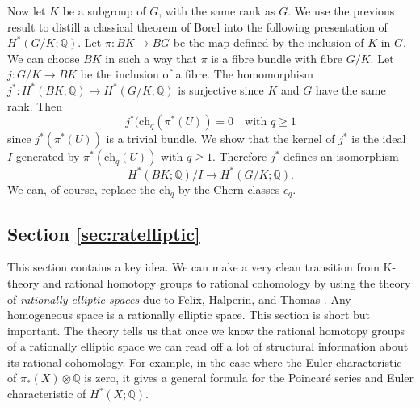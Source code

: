 \documentclass[twoside,a4paper,reqno,11pt]{amsart}
\newcommand{\K}{\mathrm{K}}
\newcommand{\Q}{\mathbb{Q}}
\renewcommand{\o}{\otimes}
\newcommand{\Spin}{\mathrm{Spin}}
\newcommand{\ch}{\mathrm{ch}}
\begin{document}
Now let $K$ be a subgroup of $G$, with the same rank as $G$. We use the previous result to distill a classical theorem of Borel into the following presentation of $H^*(G/K; \Q)$.  Let $\pi : BK \to BG$ be the map defined by the inclusion of $K$ in $G$.  We can choose $BK$ in such a way that $\pi$ is a fibre bundle with fibre $G/K$.  Let $j : G/K \to BK$ be the inclusion of a fibre.  The homomorphism $j^*: H^*(BK; \Q) \to H^*(G/K; \Q)$ is surjective since $K$ and $G$ have the same rank.  Then
 $$
 j^*(\ch_q(\pi^*(U)) = 0 \quad  \text{with $q \geq 1$}
 $$
since $j^*(\pi^*(U))$ is a trivial bundle.  We show that the kernel of $j^*$ is the ideal $I$ generated by $\pi^*(\ch_q(U))$ with $q \geq 1$.  Therefore $j^*$ defines an isomorphism
$$
H^*(BK; \Q)/I \to H^*(G/K; \Q).
$$
We can, of course, replace the $\ch_q$ by the Chern classes $c_q$. %

\subsection*{Section \ref{sec:ratelliptic}} 
This section contains a key idea. We can make a very clean transition from $\K$-theory and rational homotopy groups to rational cohomology by using the theory of {\em rationally elliptic spaces} due to Felix, Halperin, and Thomas \cite{felix2001rational}.  Any homogeneous space is a rationally elliptic space.  This section is short but important.  The theory tells us that once we know the rational homotopy groups of a rationally elliptic space we can read off a lot of structural information about its rational cohomology.  For example, in the case where the Euler characteristic of $\pi_*(X)\o\Q$ is zero, it gives a general formula for the Poincar\'{e} series and Euler characteristic of $H^*(X; \Q)$.  
\end{document}

